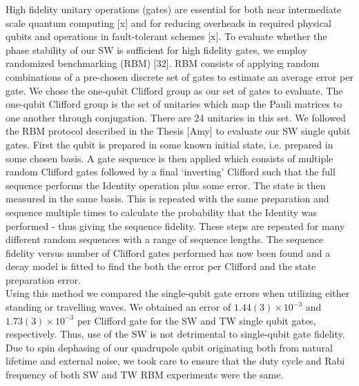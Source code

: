 \documentclass[12pt]{iopart}
\begin{document}
    High fidelity unitary operations (gates) are essential for both
    near intermediate scale quantum computing [x] and for reducing
    overheads in required physical qubits and operations in
    fault-tolerant schemes [x]. To evaluate whether the phase
    stability of our SW is sufficient for high fidelity gates, we
    employ randomized benchmarking (RBM) [32].  RBM consists of
    applying random combinations of a pre-chosen discrete set of gates
    to estimate an average error per gate.  We chose the one-qubit
    Clifford group as our set of gates to evaluate. The one-qubit
    Clifford group is the set of unitaries which map the Pauli
    matrices to one another through conjugation. There are 24
    unitaries in this set. We followed the RBM protocol
    described in the Thesis [Amy] to evaluate our SW single qubit
    gates. First the qubit is prepared in some known initial state,
    i.e. prepared in some chosen basis. A gate sequence is then
    applied which consists of multiple random Clifford gates followed
    by a final `inverting' Clifford such that the full sequence performs
    the Identity operation plus some error. The state is then measured
    in the same basis. This is repeated with the same preparation and
    sequence multiple times to calculate the probability that the
    Identity was performed - thus giving the sequence fidelity. These
    steps are repeated for many different random sequences with a
    range of sequence lengths. The sequence fidelity versus number of
    Clifford gates performed has now been found and a decay model is fitted
    to find the both the error per Clifford and the state preparation
    error.\\
    Using this method we compared the single-qubit gate errors when
    utilizing either standing or travelling waves. We obtained an
    error of $1.44(3) \times 10^{-3}$ and $1.73(3) \times 10^{-3}$ per
    Clifford gate for the SW and TW single qubit gates,
    respectively. Thus, use of the SW is not detrimental to
    single-qubit gate fidelity. Due to spin dephasing of our
    quadrupole qubit originating both from natural lifetime and
    external noise, we took care to ensure that the duty cycle and
    Rabi frequency of both SW and TW RBM experiments were the same. \\





\end{document}
